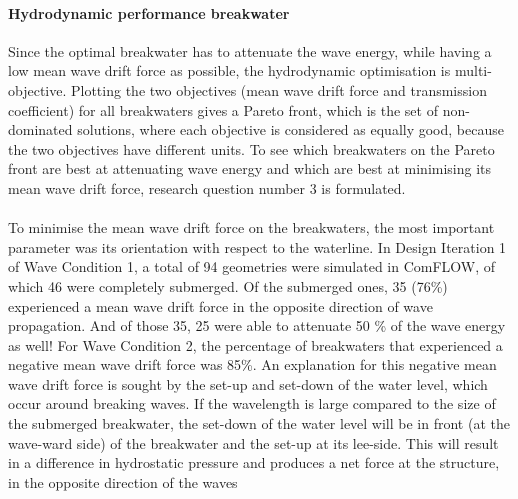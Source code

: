 \paragraph{Hydrodynamic performance breakwater}
Since the optimal breakwater has to attenuate the wave energy, while having a low mean wave drift force as possible, the hydrodynamic optimisation is multi-objective. Plotting the two objectives (mean wave drift force and transmission coefficient) for all breakwaters gives a Pareto front, which is the set of non-dominated solutions, where each objective is considered as equally good, because the two objectives have different units. To see which breakwaters on the Pareto front are best at attenuating wave energy and which are best at minimising its mean wave drift force, research question number 3 is formulated.\\
\\
To minimise the mean wave drift force on the breakwaters, the most important parameter was its orientation with respect to the waterline. In Design Iteration 1 of Wave Condition 1, a total of 94 geometries were simulated in ComFLOW, of which 46 were completely submerged. Of the submerged ones, 35 (76\%) experienced a mean wave drift force in the opposite direction of wave propagation. And of those 35, 25 were able to attenuate 50 \% of the wave energy as well! For Wave Condition 2, the percentage of breakwaters that experienced a negative mean wave drift force was 85\%. An explanation for this negative mean wave drift force is sought by the set-up and set-down of the water level, which occur around breaking waves. If the wavelength is large compared to the size of the submerged breakwater, the set-down of the water level will be in front (at the wave-ward side) of the breakwater and the set-up at its lee-side. This will result in a difference in hydrostatic pressure and produces a net force at the structure, in the opposite direction of the waves\\
\\
